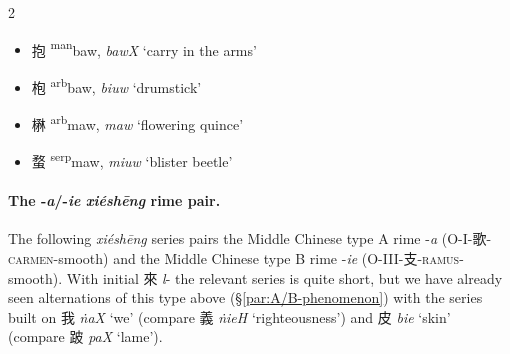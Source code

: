 \begin{multicols}{2}
\medskip

\begin{itemize}

    \item {\Large{抱}} %
    {\large{{\textsuperscript{man}}baw}},
    \textit{bawX} `carry in the arms'        %

    \item {\Large{枹}} %
    {\large{{\textsuperscript{arb}}baw}},
    \textit{biuw} `drumstick'        %

\end{itemize}

\medskip

\begin{itemize}

    \item {\Large{楙}} %
    {\large{{\textsuperscript{arb}}maw}},
    \textit{maw} `flowering quince'   %

    \item {\Large{蝥}} %
    {\large{{\textsuperscript{serp}}maw}},
    \textit{miuw} `blister beetle'    %

\end{itemize}

\end{multicols}






\paragraph{The -\textit{a}/-\textit{ie} \textit{xiéshēng} rime pair.}
\label{par:a-ie-XS-pair}
The following \textit{xiéshēng} series pairs the Middle Chinese type A rime -\textit{a} (O-I-歌-\textsc{carmen}-smooth) and the Middle Chinese type B rime -\textit{ie} (O-III-支-\textsc{ramus}-smooth). 
With initial 來 \textit{l}- the relevant series is quite short, but we have already seen alternations of this type above (§\ref{par:A/B-phenomenon}) 
with the series built on {\large{我}}
\textit{ṅaX} `we' (compare {\large{義}} \textit{ṅieH} `righteousness') and {\large{皮}} \textit{bie} `skin' (compare {\large{跛}} \textit{paX} `lame').


